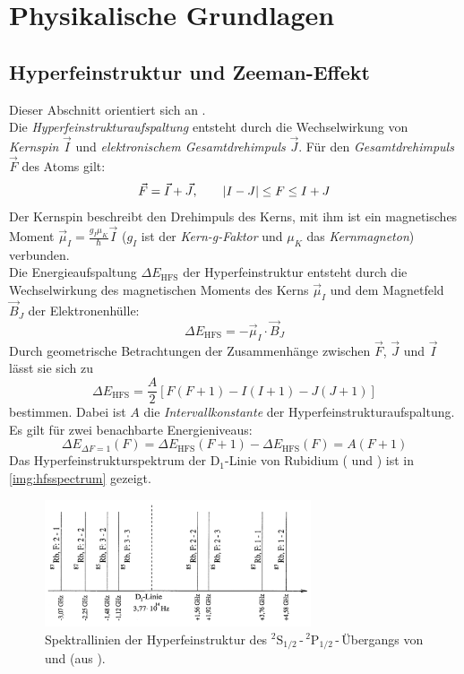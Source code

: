 \section{Physikalische Grundlagen}

\subsection{Hyperfeinstruktur und Zeeman-Effekt}
Dieser Abschnitt orientiert sich an \cite{staatsex}. \\
Die \emph{Hyperfeinstrukturaufspaltung} entsteht durch die Wechselwirkung von \emph{Kernspin} $\vec{I}$ und 
\emph{elektronischem Gesamtdrehimpuls} $\vec{J}$. Für den \emph{Gesamtdrehimpuls} $\vec{F}$ des Atoms gilt:
\begin{equation}
    \vec{F} = \vec{I} + \vec{J}, \qquad \left|I - J\right| \leq F \leq I + J
\end{equation}
Der Kernspin beschreibt den Drehimpuls des Kerns, mit ihm ist ein magnetisches Moment 
$\vec{\mu}_I = \frac{g_I \mu_K}{\hbar} \vec{I}$ ($g_I$ ist der \emph{Kern-g-Faktor} und
$\mu_K$ das \emph{Kernmagneton}) verbunden. \\
Die Energieaufspaltung $\Delta E_\text{HFS}$ der Hyperfeinstruktur entsteht durch die Wechselwirkung des magnetischen Moments 
des Kerns $\vec{\mu}_I$ und dem Magnetfeld $\vec{B}_J$ der Elektronenhülle:
\begin{equation}
    \Delta E_\text{HFS} = - \vec{\mu}_I \cdot \vec{B}_J
\end{equation}
Durch geometrische Betrachtungen der Zusammenhänge zwischen $\vec{F}$, $\vec{J}$ und $\vec{I}$ lässt sie sich zu 
\begin{equation}
    \Delta E_\text{HFS} = \frac{A}{2} \left[ F(F+1) - I(I+1) - J(J+1) \right]
\end{equation}
bestimmen. Dabei ist $A$ die \emph{Intervallkonstante} der Hyperfeinstrukturaufspaltung. Es gilt für zwei benachbarte Energieniveaus:
\begin{equation}
    \label{eq:ehfs:diff}
    \Delta E_{\Delta F = 1} (F) = \Delta E_\text{HFS}(F+1) - \Delta E_\text{HFS}(F) = A(F+1)
\end{equation}
Das Hyperfeinstrukturspektrum der D$_1$-Linie von Rubidium ( und ) ist in \autoref{img:hfsspectrum} gezeigt.
\begin{figure}[H]
\begin{center}
  \includegraphics[width=0.7\textwidth]{../img/HFSspect_theo.png}
  \caption{Spektrallinien der Hyperfeinstruktur des ${}^2\text{S}_{1/2}$\,-\,${}^2\text{P}_{1/2}$\,-\,Übergangs
  von  und  (aus \cite{manual}).}
  \label{img:hfsspectrum}
\end{center}
\end{figure} 

